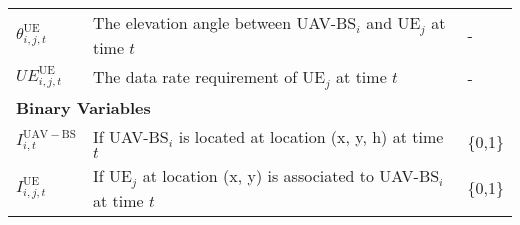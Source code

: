 \begin{table*}
\begin{adjustbox}{width=\columnwidth,center}
\begin{latin}
\begin{tabular}{|lll|}
\multicolumn{1}{|l|}{$\theta_{i,j,t}^{\mathrm{UE}}$}                      & \multicolumn{1}{l|}{The elevation angle between UAV-BS$_{i}$ and UE$_{j}$ at time $t$}                     &  -               \\ 

\multicolumn{1}{|l|}{$UE_{i,j,t}^{\mathrm{UE}}$}                & \multicolumn{1}{l|}{The data rate requirement of UE$_{j}$ at time $t$}   &  -       \\ \hline 

\multicolumn{3}{|l|}{\textbf{Binary Variables}}                     \\  \hline
\multicolumn{1}{|l|}{$I_{i,t}^{\mathrm{UAV-BS}}$}                      & \multicolumn{1}{l|}{If UAV-BS$_{i}$ is located at location (x, y, h) at time $t$ }                     &        \{0,1\}       \\ 
\multicolumn{1}{|l|}{$I_{i,j,t}^{\mathrm{UE}}$}                      & \multicolumn{1}{l|}{If UE$_{j}$ at location (x, y) is associated to UAV-BS$_{i}$ at time $t$}                     &        \{0,1\}         \\ \hline
\end{tabular}
\label{tab:tbl_formulatio}
\end{latin}
\end{adjustbox}
\end{table*}